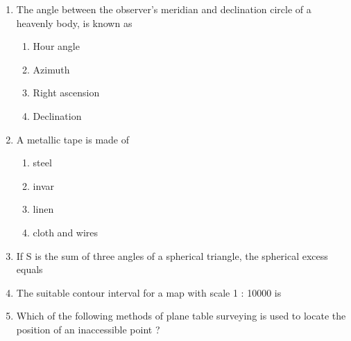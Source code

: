 \documentclass[11pt,a4paper]{article}
\begin{document}
\begin{enumerate}
\item{The angle between the observer's meridian and declination circle of a heavenly body, is known as}
\begin{enumerate}[label=\Alph*.]
\item{Hour angle}
\item{Azimuth}
\item{Right ascension}
\item{Declination}
\end{enumerate}
\item{A metallic tape is made of}
\begin{enumerate}[label=\Alph*.]
\item{steel}
\item{invar}
\item{linen}
\item{cloth and wires}
\end{enumerate}
\item{If S is the sum of three angles of a spherical triangle, the spherical excess equals}
\\
\item{The suitable contour interval for a map with scale 1 : 10000 is}
\\
\item{Which of the following methods of plane table surveying is used to locate the position of an inaccessible point ?}
\\
\end{enumerate}
\end{document}
